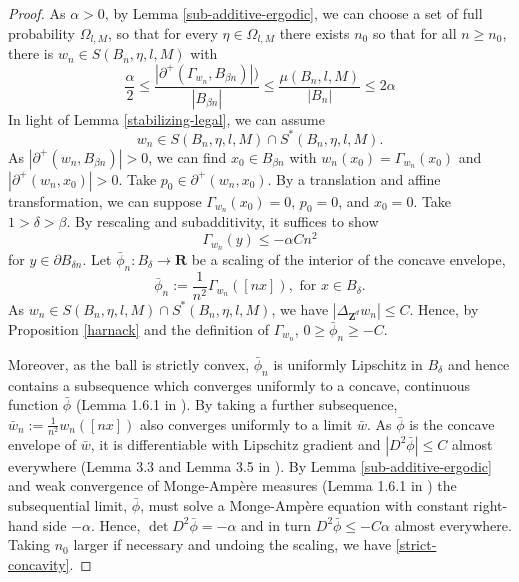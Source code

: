 \documentclass[12pt]{amsart}
\newcommand{\R}{\mathbf{R}}
\newcommand{\Z}{\mathbf{Z}}
\begin{document}
\begin{proof}
As $\alpha > 0$, by Lemma \ref{sub-additive-ergodic}, we can choose a set of full probability $\Omega_{l,M}$, so that for every $\eta \in \Omega_{l,M}$ there exists $n_0$ so that for all $n \geq n_0$,  there is $w_n \in S(B_n, \eta, l, M)$ with 
\begin{equation} \label{spreadout}
\frac{\alpha}{2} \leq \frac{ |\partial^+(\Gamma_{w_n},B_{\beta n})|)}{|B_{\beta n}|} \leq \frac{\mu(B_n,l,M)}{|B_{n}|} \leq 2 \alpha
\end{equation}
In light of Lemma \ref{stabilizing-legal}, we can assume 
\[
w_n \in S(B_{n}, \eta, l, M) \cap S^*(B_{n}, \eta, l,M).
\] 
As $|\partial^+(w_n, B_{\beta n})| > 0$, we can find $x_0 \in B_{\beta n}$ with $w_n(x_0) = \Gamma_{w_n}(x_0)$ and $|\partial^+(w_n,x_0)| > 0$. Take $p_0 \in \partial^+(w_n,x_0)$. By a translation and affine transformation, we can suppose $\Gamma_{w_n}(x_0) = 0$, $p_0 = 0$, and $x_0 = 0$. Take $1 > \delta > \beta$. By rescaling and subadditivity, it suffices to show
\begin{equation} \label{strict-concavity}
\Gamma_{w_n}(y) \leq - \alpha C n^2
\end{equation}
for $y \in \partial B_{\delta n}$. Let $\bar{\phi}_n : B_{\delta} \to \R$ be a scaling of the interior of the concave envelope, 
\[
\bar{\phi}_n:= \frac{1}{n^2} \Gamma_{w_n}( [n x]), \mbox{ for $x \in B_{\delta}$}.
\]
As $w_n \in S(B_n, \eta, l, M) \cap S^*(B_n, \eta, l, M)$, we have $|\Delta_{\Z^d} w_n | \leq C$. Hence,  by Proposition \ref{harnack} and the definition of $\Gamma_{w_n}$, $0 \geq \bar{\phi}_n \geq -C$. 

Moreover, as the ball is strictly convex,  $\bar{\phi}_n$ is uniformly Lipschitz in $B_{\delta}$ and hence contains a subsequence which converges uniformly to a concave, continuous function $\bar{\phi}$ (Lemma 1.6.1 in \cite{gutierrez2016monge}). By taking a further subsequence, $\bar{w}_n := \frac{1}{n^2} w_n([n x])$ also converges uniformly to a limit $\bar{w}$. As $\bar{\phi}$ is the concave envelope of $\bar{w}$, it is differentiable 
with Lipschitz gradient and $|D^2 \bar{\phi}| \leq C$ almost everywhere (Lemma 3.3 and Lemma 3.5 in \cite{roberts1995fully}). By Lemma \ref{sub-additive-ergodic} 
and weak convergence of Monge-Amp{\`e}re measures (Lemma 1.6.1 in \cite{gutierrez2016monge}) the subsequential limit, $\bar{\phi}$, must solve a Monge-Amp{\`e}re equation with constant right-hand side $-\alpha$. Hence, $\det D^2 \bar{\phi} = -\alpha$ and in turn $D^2 \bar{\phi} \leq -C \alpha$ almost everywhere. Taking $n_0$ larger if necessary and undoing the scaling,
we have \eqref{strict-concavity}.

\end{proof}
\end{document}
